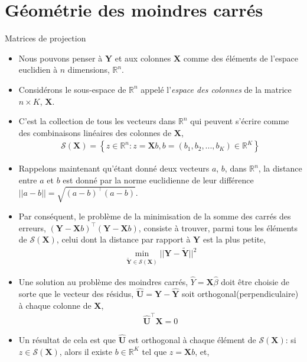 \section{Géométrie des moindres carrés}
\frame{\sectionpage}
\begin{frame}[allowframebreaks]{Matrices de projection}
\begin{itemize}
\item Nous pouvons penser à $\mathbf{Y}$ et aux colonnes $\mathbf{X}$
  comme des éléments de l'espace euclidien à $n$ dimensions,
  $\mathbb{R}^n$. 

\item Considérons  le sous-espace de $\mathbb{R}^n$
  appelé l'\emph{espace des colonnes} de la matrice $n\times K$,
  $\mathbf{X}$. 
\item C'est la collection de tous les vecteurs dans $\mathbb{R}^n$ qui peuvent s'écrire comme des combinaisons linéaires des colonnes de $\mathbf{X}$,
\begin{align*}
\mathcal{S}(\mathbf{X}) = \left\{z \in \mathbb{R}^n: z = \mathbf{X}b, b = (b_1, b_2,...,b_K) \in \mathbb{R}^K  \right\}
\end{align*}
\item Rappelons maintenant qu'\'etant donné deux vecteurs $a$, $b$, dans $\mathbb{R}^n$, la
  distance entre $a$ et $b$ est donné par la norme
  euclidienne  de leur différence $||a-b|| =
  \sqrt{(a-b)^\top(a-b)}$. 
\item Par conséquent, le problème de  la minimisation de la somme des
  carrés des erreurs,
  $(\mathbf{Y}-\mathbf{X}b)^\top(\mathbf{Y}-\mathbf{X}b)$, 
  consiste à trouver, parmi tous les éléments de $\mathcal{S}(\mathbf{X})$, celui dont la distance par rapport à $\mathbf{Y}$ est la plus petite,
\begin{align*}
\underset{\tilde{\mathbf{Y}}\in \mathcal{S}(\mathbf{X})}{\min} ||\mathbf{Y} - \tilde{\mathbf{Y}}||^2
\end{align*}
\item Une solution au problème des moindres carrés, $\widehat{Y} = \mathbf{X}\widehat{\beta}$ doit être choisie de sorte que le vecteur des résidus, $\widehat{\mathbf{U}} = \mathbf{Y}-\widehat{\mathbf{Y}}$ soit orthogonal(perpendiculaire) à chaque colonne de $\mathbf{X}$,
\begin{align*}
\widehat{\mathbf{U}}^\top\mathbf{X} = 0
\end{align*}
\item Un  résultat de cela est que $\widehat{\mathbf{U}}$ est orthogonal à chaque élément de $\mathcal{S}(\mathbf{X})$: si $z\in \mathcal{S}(\mathbf{X})$, alors il existe $b\in\mathbb{R}^K$ tel que $z=\mathbf{X}b$, et,

\end{itemize}
\end{frame}
